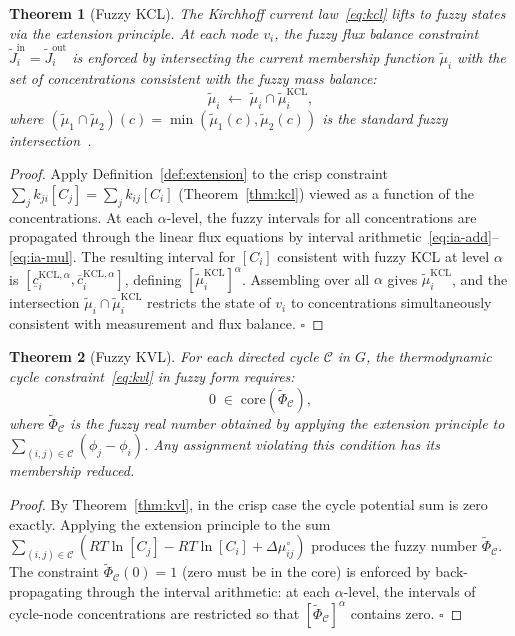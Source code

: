 \documentclass[twocolumn,10pt,a4paper]{article}
\newtheorem{theorem}{Theorem}[section]
\begin{document}
\begin{theorem}[Fuzzy KCL]
\label{thm:fuzzy-kcl}
The Kirchhoff current law~\eqref{eq:kcl} lifts to fuzzy states via the
extension principle.  At each node $v_i$, the fuzzy flux balance constraint
$\widetilde{J}_i^{\mathrm{in}}=\widetilde{J}_i^{\mathrm{out}}$ is enforced by
intersecting the current membership function $\tilde{\mu}_i$ with the set of
concentrations consistent with the fuzzy mass balance:
\begin{equation}
  \tilde{\mu}_i \;\leftarrow\; \tilde{\mu}_i \cap \tilde{\mu}_i^{\mathrm{KCL}},
  \label{eq:fuzzy-kcl}
\end{equation}
where $(\tilde{\mu}_1\cap\tilde{\mu}_2)(c)=\min(\tilde{\mu}_1(c),\tilde{\mu}_2(c))$
is the standard fuzzy intersection~\cite{Zadeh1965}.
\end{theorem}

\begin{proof}
Apply Definition~\ref{def:extension} to the crisp constraint
$\sum_jk_{ji}[C_j]=\sum_jk_{ij}[C_i]$ (Theorem~\ref{thm:kcl}) viewed as a
function of the concentrations.  At each $\alpha$-level, the fuzzy intervals
for all concentrations are propagated through the linear flux equations by
interval arithmetic~\eqref{eq:ia-add}--\eqref{eq:ia-mul}.  The resulting
interval for $[C_i]$ consistent with fuzzy KCL at level $\alpha$ is
$[\underline{c}_i^{\mathrm{KCL},\alpha},\overline{c}_i^{\mathrm{KCL},\alpha}]$,
defining $[\tilde{\mu}_i^{\mathrm{KCL}}]^\alpha$.  Assembling over all $\alpha$
gives $\tilde{\mu}_i^{\mathrm{KCL}}$, and the intersection
$\tilde{\mu}_i\cap\tilde{\mu}_i^{\mathrm{KCL}}$ restricts the state of $v_i$
to concentrations simultaneously consistent with measurement and flux balance.
$\square$
\end{proof}

\begin{theorem}[Fuzzy KVL]
\label{thm:fuzzy-kvl}
For each directed cycle $\mathcal{C}$ in $G$, the thermodynamic cycle
constraint~\eqref{eq:kvl} in fuzzy form requires:
\begin{equation}
  0\;\in\;\mathrm{core}\!\left(\widetilde{\Phi}_{\mathcal{C}}\right),
  \label{eq:fuzzy-kvl}
\end{equation}
where $\widetilde{\Phi}_{\mathcal{C}}$ is the fuzzy real number obtained by
applying the extension principle to
$\sum_{(i,j)\in\mathcal{C}}(\phi_j-\phi_i)$.  Any assignment violating this
condition has its membership reduced.
\end{theorem}

\begin{proof}
By Theorem~\ref{thm:kvl}, in the crisp case the cycle potential sum is zero
exactly.  Applying the extension principle to the sum
$\sum_{(i,j)\in\mathcal{C}}(RT\ln[C_j]-RT\ln[C_i]+\Delta\mu^\circ_{ij})$
produces the fuzzy number $\widetilde{\Phi}_{\mathcal{C}}$.  The constraint
$\widetilde{\Phi}_{\mathcal{C}}(0)=1$ (zero must be in the core) is enforced
by back-propagating through the interval arithmetic: at each $\alpha$-level,
the intervals of cycle-node concentrations are restricted so that
$[\widetilde{\Phi}_{\mathcal{C}}]^\alpha$ contains zero.  $\square$
\end{proof}
\end{document}
